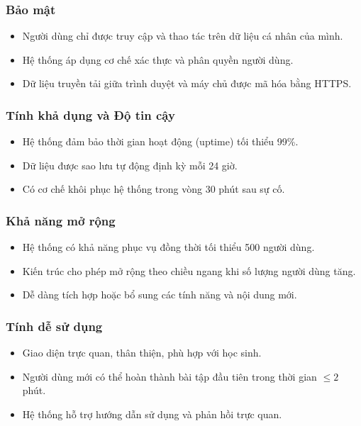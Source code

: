 \subsubsection{Bảo mật}
\begin{itemize}[leftmargin=2.0cm]
	\item Người dùng chỉ được truy cập và thao tác trên dữ liệu cá nhân của mình.
	\item Hệ thống áp dụng cơ chế xác thực và phân quyền người dùng.
	\item Dữ liệu truyền tải giữa trình duyệt và máy chủ được mã hóa bằng HTTPS.
\end{itemize}

\subsubsection{Tính khả dụng và Độ tin cậy}
\begin{itemize}[leftmargin=2.0cm]
	\item Hệ thống đảm bảo thời gian hoạt động (uptime) tối thiểu 99\%.
	\item Dữ liệu được sao lưu tự động định kỳ mỗi 24 giờ.
	\item Có cơ chế khôi phục hệ thống trong vòng 30 phút sau sự cố.
\end{itemize}

\subsubsection{Khả năng mở rộng}
\begin{itemize}[leftmargin=2.0cm]
	\item Hệ thống có khả năng phục vụ đồng thời tối thiểu 500 người dùng.
	\item Kiến trúc cho phép mở rộng theo chiều ngang khi số lượng người dùng tăng.
	\item Dễ dàng tích hợp hoặc bổ sung các tính năng và nội dung mới.
\end{itemize}

\subsubsection{Tính dễ sử dụng}
\begin{itemize}[leftmargin=2.0cm]
	\item Giao diện trực quan, thân thiện, phù hợp với học sinh.
	\item Người dùng mới có thể hoàn thành bài tập đầu tiên trong thời gian $\leq 2$ phút.
	\item Hệ thống hỗ trợ hướng dẫn sử dụng và phản hồi trực quan.
\end{itemize}

